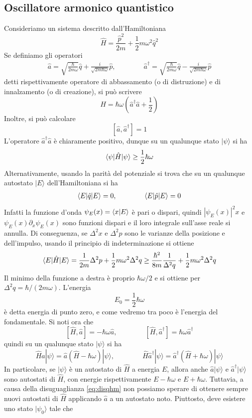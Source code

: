 \documentclass[a4paper, 11pt]{article}
\newcommand{\imp}{\hat{p}}
\newcommand{\ham}{\hat{H}}
\renewcommand{\ket}[1]{| #1\rangle}
\begin{document}
\subsection{Oscillatore armonico quantistico}
Consideriamo un sistema descritto dall'Hamiltoniana
\[\ham=\frac{\imp^2}{2m}+\frac{1}{2}m\omega^2\hat{q}^2\]
Se definiamo gli operatori
\begin{align*}
\hat{a}=\sqrt{\frac{\hbar}{2m\omega}}\hat q+\frac{i}{\sqrt{2m\hbar\omega}}\imp,\quad\quad\quad\quad {\hat a}^\dagger=\sqrt{\frac{\hbar}{2m\omega}}\hat{q}-\frac{i}{\sqrt{2m\hbar\omega}}\imp
\end{align*}
detti rispettivamente operatore di abbassamento (o di distruzione) e di innalzamento (o di creazione), si può scrivere
\[H=\hbar\omega\left(\hat a^\dagger \hat a+\frac{1}{2}\right)\]
Inoltre, si può calcolare
\[[\hat a,\hat a^\dagger]=1\]
L'operatore $\hat a^\dagger \hat a$ è chiaramente positivo, dunque su un qualunque stato $\ket\psi$ si ha
\begin{equation}\braketop{\psi}{\ham}{\psi}\geq\frac{1}{2}\hbar\omega\label{eq:disqhm}\end{equation}
Alternativamente, usando la parità del potenziale si trova che su un qualunque autostato $\ket{E}$ dell'Hamiltoniana si ha
\begin{align*}
\langle E|\hat q|E\rangle=0,\quad\quad\quad\quad\langle E|\hat p|E\rangle=0
\end{align*}
Infatti la funzione d'onda $\psi_E(x)=\langle x\vert E\rangle$ è pari o dispari, quindi $\left|\psi_E(x)\right|^2x$ e $\psi_E(x)\partial_x\psi_E(x)$ sono funzioni dispari e il loro integrale sull'asse reale si annulla. Di conseguenza, se $\Delta^2x$ e $\Delta^2p$ sono le varianze della posizione e dell'impulso, usando il principio di indeterminazione si ottiene
\[\braketop{E}{\ham}{E}=\frac{1}{2m}\Delta^2p+\frac{1}{2}m\omega^2\Delta^2q\geq\frac{\hbar^2}{8m}\frac{1}{\Delta^2q}+\frac{1}{2}m\omega^2\Delta^2q\]
Il minimo della funzione a destra è proprio $\hbar\omega/2$ e si ottiene per $\Delta^2q=\hbar/(2m\omega)$. L'energia
\[E_0=\frac{1}{2}\hbar\omega\]
è detta energia di punto zero, e come vedremo tra poco è l'energia del fondamentale. Si noti ora che
\[[\ham,\hat a]=-\hbar\omega \hat a,\quad\quad\quad\quad[\hat H,\hat a^\dagger]=\hbar\omega \hat a^\dagger\]
quindi su un qualunque stato $\ket\psi$ si ha
\[\hat H\hat a\ket\psi=\hat a(\hat H-\hbar\omega)\ket\psi,\quad\quad\quad\quad \hat H\hat a^\dagger\ket\psi=\hat a^\dagger(\hat H+\hbar\omega)\ket\psi\]
In particolare, se $\ket\psi$ è un autostato di $\hat H$ a energia $E$, allora anche $\hat a\ket\psi$ e $\hat a^\dagger\ket\psi$ sono autostati di $\hat H$, con energie rispettivamente $E-\hbar\omega$ e $E+\hbar\omega$. Tuttavia, a causa della disuguaglianza \ref{eq:disqhm} non possiamo sperare di ottenere sempre nuovi autostati di $\hat H$ applicando $\hat a$ a un autostato noto. Piuttosto, deve esistere uno stato $\ket{\psi_0}$ tale che
\end{document}

